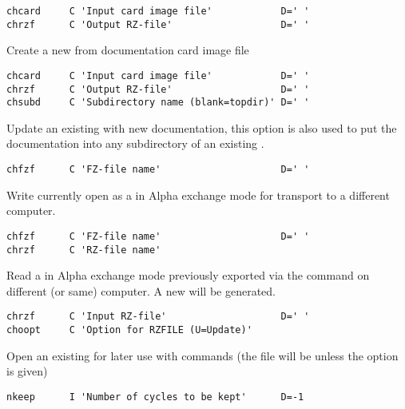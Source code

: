 \begin{verbatim}
chcard     C 'Input card image file'            D=' '
chrzf      C 'Output RZ-file'                   D=' '
\end{verbatim}
 
Create a new \RZfile{} from documentation card image file
 
 
\begin{verbatim}
chcard     C 'Input card image file'            D=' '
chrzf      C 'Output RZ-file'                   D=' '
chsubd     C 'Subdirectory name (blank=topdir)' D=' '
\end{verbatim}
 
Update an existing \RZfile{} with new documentation, this option
is also used to put the documentation into any subdirectory
of an existing \RZfile.
 
 
\begin{verbatim}
chfzf      C 'FZ-file name'                     D=' '
\end{verbatim}
 
Write currently open \RZfile{} as a \FZfile{} in Alpha exchange mode for
transport to a different computer.
 
\newpage

 
\begin{verbatim}
chfzf      C 'FZ-file name'                     D=' '
chrzf      C 'RZ-file name'
\end{verbatim}
 
Read a \FZfile{} in Alpha exchange mode previously exported via the
command  on different (or same) computer. 
A new \RZfile{} will be generated.
 
 
\begin{verbatim}
chrzf      C 'Input RZ-file'                    D=' '
choopt     C 'Option for RZFILE (U=Update)'
\end{verbatim}
 
Open an existing \RZfile{} for later use with  
commands
(the file will be  unless the  option is given)
 
 
\begin{verbatim}
nkeep      I 'Number of cycles to be kept'      D=-1
\end{verbatim}
 
